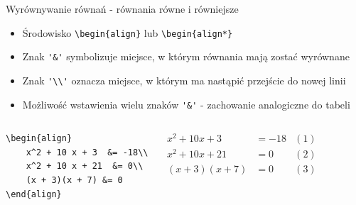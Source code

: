 \documentclass{beamer}
\theoremstyle{newblock}
\begin{document}
\begin{frame}[fragile]{Wyrównywanie równań - równania równe i równiejsze}

    \begin{itemize}
        \item Środowisko \verb|\begin{align}| lub \verb|\begin{align*}|

        \item Znak \verb|'&'| symbolizuje miejsce, w którym równania mają zostać wyrównane

        \item Znak \verb|'\\'| oznacza miejsce, w którym ma nastąpić przejście do nowej linii

        \item Możliwość wstawienia wielu znaków \verb|'&'| - zachowanie analogiczne do tabeli
    \end{itemize}

    \begin{columns}
        \centering
\begin{verbatim}
\begin{align}
    x^2 + 10 x + 3  &= -18\\
    x^2 + 10 x + 21  &= 0\\
    (x + 3)(x + 7) &= 0
\end{align}
\end{verbatim}
            \begin{align*}
                x^2 + 10 x + 3  &= -18 &(1)\\
                x^2 + 10 x + 21  &= 0 &(2)\\
                (x + 3)(x + 7) &= 0 &(3)
            \end{align*}
    \end{columns}
    
\end{frame}
\end{document}

